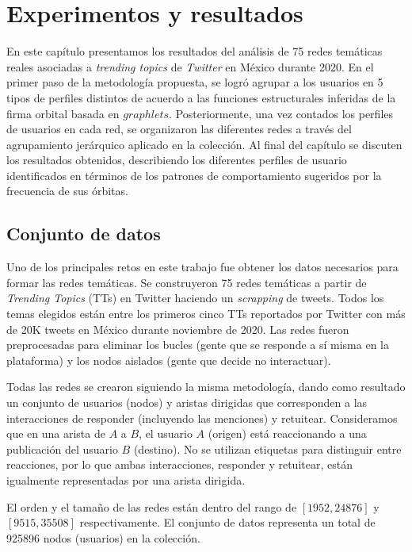 \chapter{Experimentos y resultados}
\label{chapter:5}

En este capítulo presentamos los resultados del análisis de 75 redes temáticas reales asociadas a \textit{trending topics} de \textit{Twitter} en México durante 2020. En el primer paso de la metodología propuesta, se logró agrupar a los usuarios en 5 tipos de perfiles distintos de acuerdo a las funciones estructurales inferidas de la firma orbital basada en $graphlets$. Posteriormente, una vez contados los perfiles de usuarios en cada red, se organizaron las diferentes redes a través del agrupamiento jerárquico aplicado en la colección. Al final del capítulo se discuten los resultados obtenidos, describiendo los diferentes perfiles de usuario identificados en términos de los patrones de comportamiento sugeridos por la frecuencia de sus órbitas. 

\section{Conjunto de datos}
Uno de los principales retos en este trabajo fue obtener los datos necesarios para formar las redes temáticas. Se construyeron 75 redes temáticas a partir de \textit{Trending Topics} (TTs) en Twitter haciendo un \textit{scrapping} de tweets. Todos los temas elegidos están entre los primeros cinco TTs reportados por Twitter con más de 20K tweets en México durante noviembre de 2020. Las redes fueron preprocesadas para eliminar los bucles (gente que se responde a sí misma en la plataforma) y los nodos aislados (gente que decide no interactuar).

Todas las redes se crearon siguiendo la misma metodología, dando como resultado un conjunto de usuarios (nodos) y aristas dirigidas que corresponden a las interacciones de responder (incluyendo las menciones) y retuitear. Consideramos que en una arista de $A$ a $B$, el usuario $A$ (origen) está reaccionando a una publicación del usuario $B$ (destino).  No se utilizan etiquetas para distinguir entre reacciones, por lo que ambas interacciones, responder y retuitear, están igualmente representadas por una arista dirigida. 

El orden y el tamaño de las redes están dentro del rango de $[1952,24876]$ y $[9515,35508]$ respectivamente. El conjunto de datos representa un total de 925896 nodos (usuarios) en la colección.

